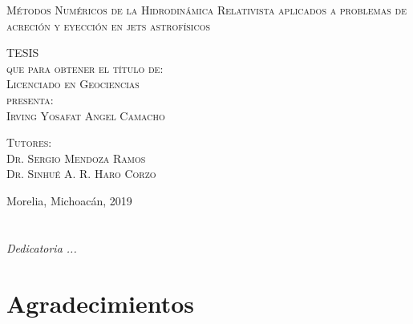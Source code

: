 \documentclass[letterpaper,12pt,oneside]{book}
\begin{document}
\begin{titlepage}
\begin{minipage}[c][0.81\textheight][t]{0.75\textwidth}
\begin{center}
                {\large\scshape Métodos Numéricos de la Hidrodinámica Relativista aplicados a problemas de acreción y eyección en jets astrofísicos}\\[.2in]

                \vspace{2cm}            

                \textsc{\LARGE T\hspace{1.5cm}E\hspace{1.5cm}S\hspace{1.5cm}I\hspace{1.5cm}S}\\[0.5cm]
                \textsc{\large que para obtener el t\'itulo de:}\\[0.5cm]
                \textsc{\large Licenciado en Geociencias}\\[0.5cm]
                \textsc{\large presenta:}\\[0.5cm]
                \textsc{\large {Irving Yosafat Angel Camacho}}\\[2cm]          

                \vspace{0.5cm}

                {\large\scshape Tutores:\\[0.3cm] {Dr. Sergio Mendoza Ramos \\ 
Dr. Sinhué A. R. Haro Corzo}}\\[.2in]

                \vspace{0.5cm}

                \large{Morelia, Michoacán,}{ }{2019}
            \end{center}
        \end{minipage}
    \end{titlepage}



\frontmatter
\chapter*{}
\begin{flushright}%
  \emph{Dedicatoria ...}
  \thispagestyle{empty}
\end{flushright}

\chapter{Agradecimientos}
\end{document}
